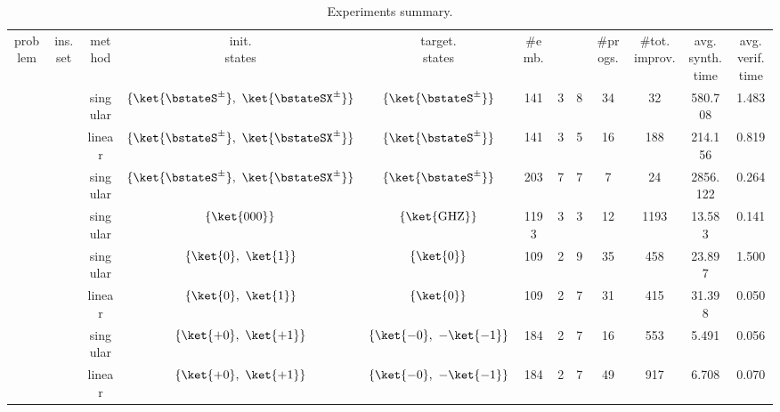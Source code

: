 \begin{table}[t]
	\begin{center}
		\begin{tabular}{|c|c|c|c|c|c|c|c|c|c|c|c|}
			\hline
			 \\
			\hline
			problem & ins. set & method & \makecell[c]{init.\\ states} & \makecell[c]{target.\\ states} & \#emb. & \makecell[c]{min. $\horizon$} & \makecell[c]{max. $\horizon$} & \#progs. & \#tot. improv. & \makecell[c]{avg. synth.\\ time} & \makecell[c]{avg. verif.\\ time} \\
			\hline
			\IPMAPAbbr & \IPMAPIns & singular & $\{\ket{\bstateS^{\pm}},~\ket{\bstateSX^{\pm}}\}$ & $\{\ket{\bstateS^{\pm}}\}$ & 141 & 3 & 8 & 34 & 32 & 580.708 & 1.483 \\
			\hline
			\IPMAPAbbr & \IPMAPIns & linear & $\{\ket{\bstateS^{\pm}},~\ket{\bstateSX^{\pm}}\}$ & $\{\ket{\bstateS^{\pm}}\}$ & 141 & 3 & 5 & 16 & 188 & 214.156 & 0.819 \\
			\hline
			\CXHAbbr & \CXHIns & singular & $\{\ket{\bstateS^{\pm}},~\ket{\bstateSX^{\pm}}\}$ & $\{\ket{\bstateS^{\pm}}\}$ & 203 & 7 & 7 & 7 & 24 & 2856.122 & 0.264 \\
			\hline
			\GHZAbbr & \GHZIns & singular & $\{\ket{000}\}$ & $\{\ket{\text{GHZ}}\}$ & 1193 & 3 & 3 & 12 & 1193 & 13.583 & 0.141 \\
			\hline
			\ResetAbbr & \ResetIns & singular & $\{\ket{0},~\ket{1}\}$ & $\{\ket{0}\}$ & 109 & 2 & 9 & 35 & 458 & 23.897 & 1.500 \\
			\hline
			\ResetAbbr & \ResetIns & linear & $\{\ket{0},~\ket{1}\}$ & $\{\ket{0}\}$ & 109 & 2 & 7 & 31 & 415 & 31.398 & 0.050 \\
			\hline
			\LPhaseAbbr & \LPhaseIns & singular & $\{\ket{{+}0},~\ket{{+}1}\}$ & $\{\ket{{-}0},~-\ket{{-}1}\}$ & 184 & 2 & 7 & 16 & 553 & 5.491 & 0.056 \\
			\hline
			\LPhaseAbbr & \LPhaseIns & linear & $\{\ket{{+}0},~\ket{{+}1}\}$ & $\{\ket{{-}0},~-\ket{{-}1}\}$ & 184 & 2 & 7 & 49 & 917 & 6.708 & 0.070 \\
			\hline
		\end{tabular}
	\end{center}
	\caption{Experiments summary.}
	\label{tab:exp_summary}
\end{table}